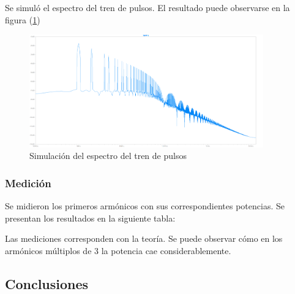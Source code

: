 Se simuló el espectro del tren de pulsos. El resultado puede observarse en la figura (\ref{fig:simpulso})

\begin{figure}[H]
	\centering
	\includegraphics[width=0.9\textwidth]{ImagenesEjercicio2/FFT-Pulsos.png}
\caption{Simulación del espectro del tren de pulsos}
	\label{fig:simpulso}
\end{figure}

\subsubsection{Medición}

Se midieron los primeros armónicos con sus correspondientes potencias. Se presentan los resultados en la siguiente tabla:

\begin{table}[H]
\end{table}

Las mediciones corresponden con la teoría. Se puede observar cómo en los armónicos múltiplos de $3$ la potencia cae considerablemente.

\subsection{Conclusiones}



